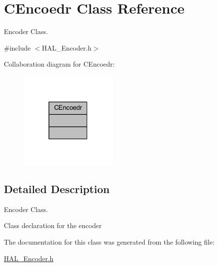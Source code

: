\hypertarget{class_c_encoedr}{}\section{C\+Encoedr Class Reference}
\label{class_c_encoedr}


Encoder Class.  




{\ttfamily \#include $<$H\+A\+L\+\_\+\+Encoder.\+h$>$}



Collaboration diagram for C\+Encoedr\+:
\nopagebreak
\begin{figure}[H]
\begin{center}
\leavevmode
\includegraphics[width=139pt]{class_c_encoedr__coll__graph}
\end{center}
\end{figure}


\subsection{Detailed Description}
Encoder Class. 

Class declaration for the encoder 

The documentation for this class was generated from the following file\+:\begin{DoxyCompactItemize}
\item 
\mbox{\hyperlink{_h_a_l___encoder_8h}{H\+A\+L\+\_\+\+Encoder.\+h}}\end{DoxyCompactItemize}
